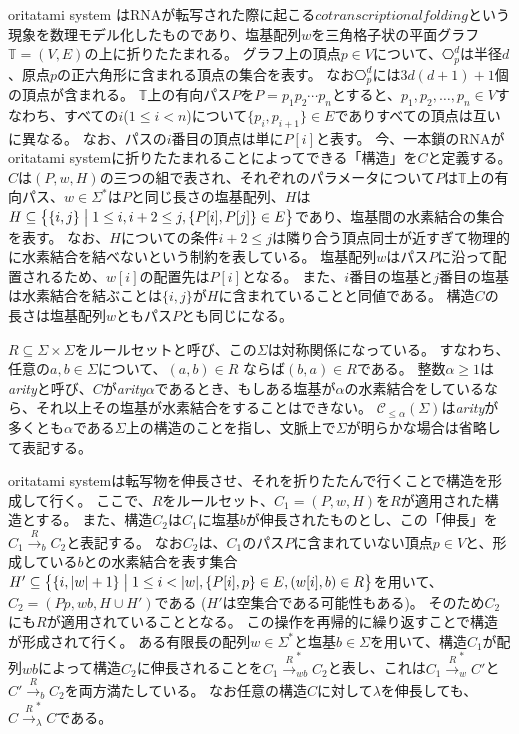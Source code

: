 \documentclass[a4,11pt]{article}
\begin{document}
oritatami system はRNAが転写された際に起こる$cotranscriptional folding$という現象を数理モデル化したものであり、塩基配列$w$を三角格子状の平面グラフ$\mathbb{T} = (V, E)$の上に折りたたまれる。
グラフ上の頂点$p \in V$について、$\hexagon_p^d$は半径$d$、原点$p$の正六角形に含まれる頂点の集合を表す。
なお$\hexagon_p^d$には$3d(d+1)+1$個の頂点が含まれる。
$\mathbb{T}$上の有向パス$P$を$P = p_1 p_2 \cdots p_n$とすると、$p_1, p_2, \ldots, p_n \in V$すなわち、すべての$i $($1 \le i < n$)について$\{p_i, p_{i+1}\} \in E$でありすべての頂点は互いに異なる。
なお、パスの$i$番目の頂点は単に$P[i]$と表す。
今、一本鎖のRNAがoritatami systemに折りたたまれることによってできる「構造」を$C$と定義する。
$C$は$(P, w, H)$の三つの組で表され、それぞれのパラメータについて$P$は$\mathbb{T}$上の有向パス、$w \in \Sigma^*$は$P$と同じ長さの塩基配列、$H$は$H \subseteq \bigl\{\{i, j\} \bigm| 1 \le i, i+2 \le j, \{P[i], P[j]\} \in E \bigr\}$であり、塩基間の水素結合の集合を表す。
なお、$H$についての条件$i+2 \le j$は隣り合う頂点同士が近すぎて物理的に水素結合を結べないという制約を表している。
塩基配列$w$はパス$P$に沿って配置されるため、$w[i]$の配置先は$P[i]$となる。
また、$i$番目の塩基と$j$番目の塩基は水素結合を結ぶことは$\{i, j\}$が$H$に含まれていることと同値である。
構造$C$の長さは塩基配列$w$ともパス$P$とも同じになる。

$R \subseteq \Sigma \times \Sigma$をルールセットと呼び、この$\Sigma$は対称関係になっている。
すなわち、任意の$a, b \in \Sigma$について、$(a, b) \in R$ ならば$(b, a) \in R$である。
整数$\alpha \ge 1$は\textit{arity}と呼び、$C$が\textit{arity}$\alpha$であるとき、もしある塩基が$\alpha$の水素結合をしているなら、それ以上その塩基が水素結合をすることはできない。
$\mathcal{C}_{\le \alpha}(\Sigma)$は\textit{arity}が多くとも$\alpha$である$\Sigma$上の構造のことを指し、文脈上で$\Sigma$が明らかな場合は省略して表記する。


oritatami systemは転写物を伸長させ、それを折りたたんで行くことで構造を形成して行く。
ここで、$R$をルールセット、$C_1 = (P, w, H)$を$R$が適用された構造とする。
また、構造$C_2$は$C_1$に塩基$b$が伸長されたものとし、この「伸長」を$C_1 \xrightarrow{R}_b C_2$と表記する。
なお$C_2$は、$C_1$のパス$P$に含まれていない頂点$p \in V$と、形成している$b$との水素結合を表す集合$H' \subseteq \bigl\{ \{i, |w|+1\} \bigm| 1 \le i < |w|, \{P[i], p\} \in E, (w[i], b) \in R \bigr\}$を用いて、$C_2 = (P p, wb, H \cup H')$である ($H'$は空集合である可能性もある)。
そのため$C_2$にも$R$が適用されていることとなる。
この操作を再帰的に繰り返すことで構造が形成されて行く。
ある有限長の配列$w \in \Sigma^*$と塩基$b \in \Sigma$を用いて、構造$C_1$が配列$wb$によって構造$C_2$に伸長されることを$C_1 \xrightarrow{R}_{wb}^* C_2$と表し、これは$C_1 \xrightarrow{R}_w^* C'$と$C' \xrightarrow{R}_b C_2$を両方満たしている。
なお任意の構造$C$に対して$\lambda$を伸長しても、$C \xrightarrow{R}_\lambda^* C$である。
\end{document}
